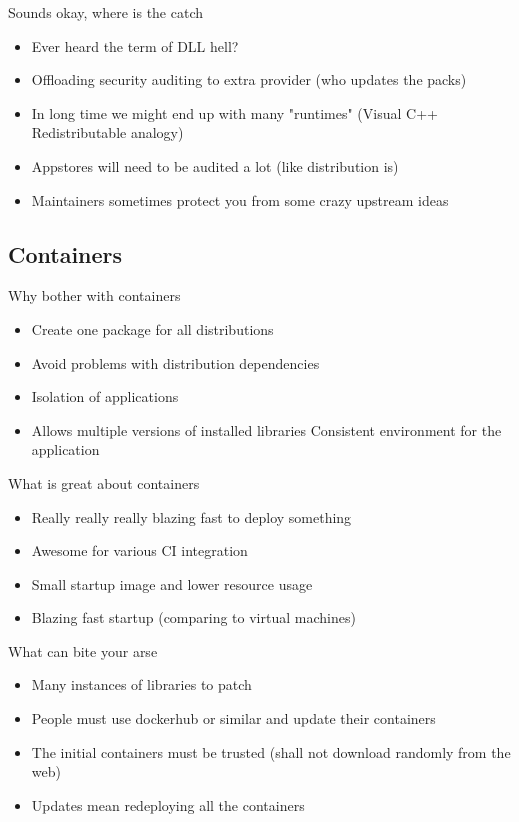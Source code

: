 \documentclass{beamer}
\begin{document}
\begin{frame}[t]{Sounds okay, where is the catch}
	\begin{itemize}
    \item Ever heard the term of DLL hell?
    \item Offloading security auditing to extra provider (who updates the packs)
    \item In long time we might end up with many "runtimes" (Visual C++ Redistributable analogy)
    \item Appstores will need to be audited a lot (like distribution is)
    \item Maintainers sometimes protect you from some crazy upstream ideas
	\end{itemize}
\end{frame}

\subsection{Containers}

\begin{frame}[t]{Why bother with containers}
	\begin{itemize}
	\item Create one package for all distributions
	\item Avoid problems with distribution dependencies
	\item Isolation of applications
	\item Allows multiple versions of installed libraries
	\itme Consistent environment for the application
	\end{itemize}
\end{frame}

\begin{frame}[t]{What is great about containers}
	\begin{itemize}
	\item Really really really blazing fast to deploy something
	\item Awesome for various CI integration
	\item Small startup image and lower resource usage
	\item Blazing fast startup (comparing to virtual machines)
	\end{itemize}
\end{frame}

\begin{frame}[t]{What can bite your arse}
	\begin{itemize}
	\item Many instances of libraries to patch
	\item People must use dockerhub or similar and update their containers
	\item The initial containers must be trusted (shall not download randomly from the web)
	\item Updates mean redeploying all the containers
	\end{itemize}
\end{frame}
\end{document}
